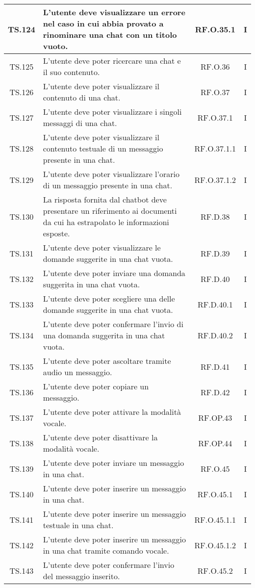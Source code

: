{{{{{{{{{{\begin{xltabular}{\textwidth}{|c|X|c|c|}
    \hline
    TS.124 & L’utente deve visualizzare un errore nel caso in cui abbia provato a rinominare una chat con un titolo vuoto. & RF.O.35.1 & I \\
    \hline
    TS.125 & L’utente deve poter ricercare una chat e il suo contenuto. & RF.O.36 & I \\
    \hline
    TS.126 & L’utente deve poter visualizzare il contenuto di una chat. & RF.O.37 & I \\
    \hline
    TS.127 & L’utente deve poter visualizzare i singoli messaggi di una chat. & RF.O.37.1 & I \\
    \hline
    TS.128 & L’utente deve poter visualizzare il contenuto testuale di un messaggio presente in una chat. & RF.O.37.1.1 & I \\
    \hline
    TS.129 & L’utente deve poter visualizzare l’orario di un messaggio presente in una chat. & RF.O.37.1.2 & I \\
    \hline
    TS.130 & La risposta fornita dal chatbot deve presentare un riferimento ai documenti da cui ha estrapolato le informazioni esposte. & RF.D.38 & I \\
    \hline
    TS.131 & L’utente deve poter visualizzare le domande suggerite in una chat vuota. & RF.D.39 & I \\
    \hline
    TS.132 & L’utente deve poter inviare una domanda suggerita in una chat vuota. & RF.D.40 & I \\
    \hline
    TS.133 & L’utente deve poter scegliere una delle domande suggerite in una chat vuota. & RF.D.40.1 & I \\
    \hline
    TS.134 & L’utente deve poter confermare l’invio di una domanda suggerita in una chat vuota. & RF.D.40.2 & I \\
    \hline
    TS.135 & L’utente deve poter ascoltare tramite audio un messaggio. & RF.D.41 & I \\
    \hline
    TS.136 & L’utente deve poter copiare un messaggio. & RF.D.42 & I \\
    \hline
    TS.137 & L’utente deve poter attivare la modalità vocale. & RF.OP.43 & I \\
    \hline
    TS.138 & L’utente deve poter disattivare la modalità vocale. & RF.OP.44 & I \\
    \hline
    TS.139 & L’utente deve poter inviare un messaggio in una chat. & RF.O.45 & I \\
    \hline
    TS.140 & L’utente deve poter inserire un messaggio in una chat. & RF.O.45.1 & I \\
    \hline
    TS.141 & L’utente deve poter inserire un messaggio testuale in una chat. & RF.O.45.1.1 & I \\
    \hline
    TS.142 & L’utente deve poter inserire un messaggio in una chat tramite comando vocale. & RF.O.45.1.2 & I \\
    \hline
    TS.143 & L’utente deve poter confermare l’invio del messaggio inserito. & RF.O.45.2 & I \\
    \end{xltabular}
    }

}}}}}}}}}
